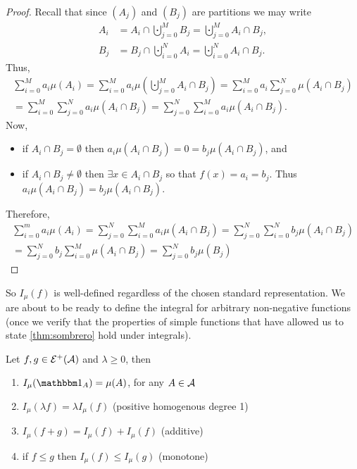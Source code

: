 \begin{proof}
	Recall that since $(A_j)$ and $(B_j)$ are partitions we may write
	\begin{align*}
		A_i &= A_i \cap \bigcupdot_{j = 0}^M B_j = \bigcupdot_{j = 0}^M A_i \cap B_j, \\
		B_j &= B_j \cap \bigcupdot_{i = 0}^N A_i = \bigcupdot_{i = 0}^N A_i \cap B_j.
	\end{align*}
	Thus,
	\begin{multline*}
		\sum_{i = 0}^M a_i \mu(A_i)
		= \sum_{i = 0}^M a_i \mu\left(\bigcupdot_{j = 0}^M A_i \cap B_j\right)
		= \sum_{i = 0}^M a_i \sum_{j = 0}^N \mu(A_i \cap B_j)\\
		= \sum_{i = 0}^M \sum_{j = 0}^N a_i \mu(A_i \cap B_j)
		= \sum_{j = 0}^N \sum_{i = 0}^M a_i \mu(A_i \cap B_j).
	\end{multline*}
	Now,
	\begin{itemize}
		\item if $A_i \cap B_j = \emptyset$ then $a_i\mu(A_i \cap B_j) = 0 = b_j \mu(A_i \cap B_j)$, and
		\item if $A_i \cap B_j \neq \emptyset$ then $\exists x \in A_i \cap B_j$ so that $f(x) = a_i = b_j$. Thus $a_i \mu(A_i \cap B_j) = b_j \mu(A_i \cap B_j)$.
	\end{itemize}
	Therefore,
	\begin{multline*}
		\sum_{i = 0}^m a_i \mu(A_i)
		= \sum_{j = 0}^N \sum_{i = 0}^M a_i \mu(A_i \cap B_j)
		= \sum_{j = 0}^N \sum_{i = 0}^N b_j \mu(A_i \cap B_j)\\
		= \sum_{j = 0}^N b_j \sum_{i = 0}^M \mu(A_i \cap B_j)
		= \sum_{j = 0}^N b_j \mu(B_j)
	\end{multline*}
\end{proof}

So $I_\mu(f)$ is well-defined regardless of the chosen standard representation. We are about to be ready to define the integral for arbitrary non-negative functions (once we verify that the properties of simple functions that have allowed us to state \autoref{thm:sombrero} hold under integrals).

\begin{thm}[Properties of $I_\mu(f)$]
	\label{thm:prop-integrals-simple}
	Let $f, g \in \mathcal{E}^+(\mathcal{A})$ and $\lambda \geq 0$, then
	\begin{enumerate}
		\item $I_\mu(\ind_A) = \mu(A)$, for any $A \in \mathcal{A}$
		\item $I_\mu(\lambda f) = \lambda I_\mu(f)$ (positive homogenous degree 1)
		\item $I_\mu(f + g) = I_\mu(f) + I_\mu(f)$ (additive)
		\item if $f \leq g$ then $I_\mu(f) \leq I_\mu(g)$ (monotone)
	\end{enumerate}	
\end{thm}

